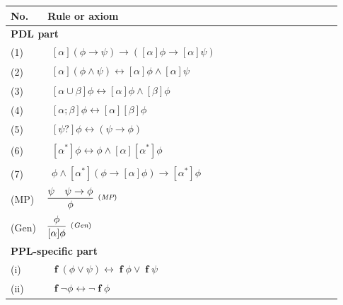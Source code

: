 \documentclass[manuscript,screen]{acmart}
\DeclareMathOperator{\seq}{;}
\DeclareMathOperator{\cho}{\cup}
\DeclareMathOperator{\ofst}{\mathbf{f}}
\newcommand{\PPL}[0]{\mbox{PPL}}
\begin{document}
\begin{table}[t]
\centering
\small
\begin{tabular}{p{0.09\linewidth}p{0.84\linewidth}}
\toprule
No. & Rule or axiom \\
\midrule
\multicolumn{2}{l}{\textbf{PDL part}}\\
(1) & $\begin{aligned}[\alpha](\phi\to\psi)\to([\alpha]\phi\to[\alpha]\psi)\end{aligned}$\\
(2) & $\begin{aligned}[\alpha](\phi\wedge\psi)\leftrightarrow[\alpha]\phi\wedge[\alpha]\psi\end{aligned}$\\
(3) & $\begin{aligned}[\alpha\cho\beta]\phi\leftrightarrow[\alpha]\phi\wedge[\beta]\phi\end{aligned}$\\
(4) & $\begin{aligned}[\alpha\seq\beta]\phi\leftrightarrow[\alpha][\beta]\phi\end{aligned}$\\
(5) & $\begin{aligned}[\psi?]\phi\leftrightarrow(\psi\to\phi)\end{aligned}$\\
(6) & $\begin{aligned}[\alpha^*]\phi\leftrightarrow\phi\wedge[\alpha][\alpha^*]\phi\end{aligned}$\\
(7) & $\begin{aligned}\phi\wedge[\alpha^*](\phi\to[\alpha]\phi)\to[\alpha^*]\phi\end{aligned}$\\
(MP) & $\begin{aligned}\infer[^{(\textit{MP})}]{\phi}{\psi & \psi\to\phi}\end{aligned}$\\
(Gen) & $\begin{aligned}\infer[^{(\textit{Gen})}]{[\alpha]\phi}{\phi}\end{aligned}$\\
\midrule
\multicolumn{2}{l}{\textbf{\PPL-specific part}}\\
(i) & $\begin{aligned}\ofst(\phi\vee\psi)\leftrightarrow\ofst\phi\vee\ofst\psi\end{aligned}$\\
(ii) & $\begin{aligned}\ofst\neg\phi\leftrightarrow\neg\ofst\phi\end{aligned}$\\

\end{tabular}
\end{table}
\end{document}
